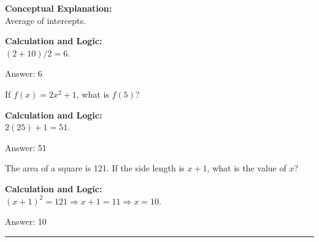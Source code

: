 \documentclass[11pt,paper=a4,answers]{exam}
\begin{document}
\begin{questions}
\begin{solution}
\textbf{Conceptual Explanation:} \\
Average of intercepts.

\vspace{20pt}

\textbf{Calculation and Logic:} \\
$(2 + 10) / 2 = 6$.

\vspace{25pt}

Answer: \colorbox{yellow!100}{6}
\end{solution}

\vspace{40pt}

\question
If $f(x) = 2x^2 + 1$, what is $f(5)$?

\begin{solution}
\textbf{Calculation and Logic:} \\
$2(25) + 1 = 51$.

\vspace{25pt}

Answer: \colorbox{yellow!100}{51}
\end{solution}

\vspace{40pt}

\question
The area of a square is 121. If the side length is $x+1$, what is the value of $x$?

\begin{solution}
\textbf{Calculation and Logic:} \\
$(x+1)^2 = 121 \Rightarrow x+1 = 11 \Rightarrow x = 10$.

\vspace{25pt}

Answer: \colorbox{yellow!100}{10}
\end{solution}


\end{questions}
\begin{center}
\rule{.5\textwidth}{1pt}
\end{center}
\end{document}
